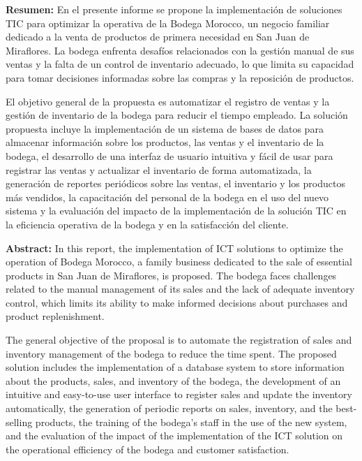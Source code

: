 \documentclass{article}
\begin{document}
  \begin{multicols}{2}
    \textbf{Resumen:} En el presente informe se propone la implementación de soluciones TIC para optimizar la operativa de la Bodega Morocco, un negocio familiar dedicado a la venta de productos de primera necesidad en San Juan de Miraflores. La bodega enfrenta desafíos relacionados con la gestión manual de sus ventas y la falta de un control de inventario adecuado, lo que limita su capacidad para tomar decisiones informadas sobre las compras y la reposición de productos.

    El objetivo general de la propuesta es automatizar el registro de ventas y la gestión de inventario de la bodega para reducir el tiempo empleado.  La solución propuesta incluye la implementación de un sistema de bases de datos para almacenar información sobre los productos, las ventas y el inventario de la bodega, el desarrollo de una interfaz de usuario intuitiva y fácil de usar para registrar las ventas y actualizar el inventario de forma automatizada, la generación de reportes periódicos sobre las ventas, el inventario y los productos más vendidos, la capacitación del personal de la bodega en el uso del nuevo sistema y la evaluación del impacto de la implementación de la solución TIC en la eficiencia operativa de la bodega y en la satisfacción del cliente.

    \columnbreak

    \textbf{Abstract:} In this report, the implementation of ICT solutions to optimize the operation of Bodega Morocco, a family business dedicated to the sale of essential products in San Juan de Miraflores, is proposed. The bodega faces challenges related to the manual management of its sales and the lack of adequate inventory control, which limits its ability to make informed decisions about purchases and product replenishment.

    The general objective of the proposal is to automate the registration of sales and inventory management of the bodega to reduce the time spent. The proposed solution includes the implementation of a database system to store information about the products, sales, and inventory of the bodega, the development of an intuitive and easy-to-use user interface to register sales and update the inventory automatically, the generation of periodic reports on sales, inventory, and the best-selling products, the training of the bodega's staff in the use of the new system, and the evaluation of the impact of the implementation of the ICT solution on the operational efficiency of the bodega and customer satisfaction.

  \end{multicols}
\end{document}
